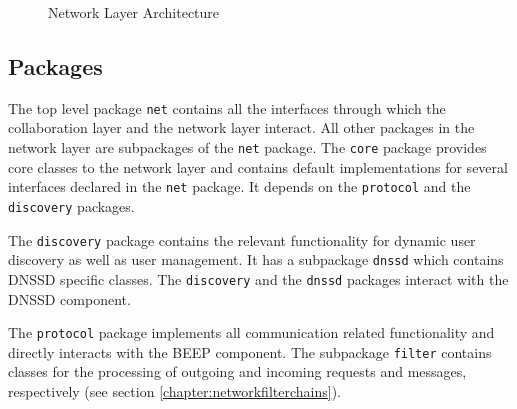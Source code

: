 \begin{figure}[H]
 \centering
 \caption{Network Layer Architecture}
 \label{fig:network.architecture}
\end{figure}


\subsection{Packages}

The top level package \texttt{net} contains all the interfaces through which the collaboration layer and the network layer interact. All other packages in the network layer are subpackages of the \texttt{net} package. The \texttt{core} package provides core classes to the network layer and contains default implementations for several interfaces declared in the \texttt{net} package. It depends on the \texttt{protocol} and the \texttt{discovery} packages.

The \texttt{discovery} package contains the relevant functionality for dynamic user discovery as well as user management. It has a subpackage \texttt{dnssd} which contains DNSSD specific classes. The \texttt{discovery} and the \texttt{dnssd} packages interact with the DNSSD component.

The \texttt{protocol} package implements all communication related functionality and directly interacts with the BEEP component. The subpackage \texttt{filter} contains classes for the processing of outgoing and incoming requests and messages, respectively (see section \ref{chapter:networkfilterchains}).

